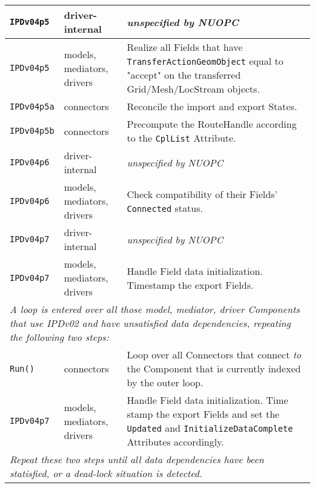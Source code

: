 \begin{longtable}[h]{|p{35mm}|p{4cm}|p{6cm}|}
     {\tt IPDv04p5}   & driver-internal             & {\em unspecified by NUOPC}\\ \hline
     {\tt IPDv04p5}   & models, mediators, drivers  & Realize all Fields that have {\tt TransferActionGeomObject} equal to "accept" on the transferred Grid/Mesh/LocStream objects.\\ \hline
     {\tt IPDv04p5a}  & connectors                  & Reconcile the import and export States.\\ \hline
     {\tt IPDv04p5b}  & connectors                  & Precompute the RouteHandle according to the {\tt CplList} Attribute.\\ \hline
     {\tt IPDv04p6}   & driver-internal             & {\em unspecified by NUOPC}\\ \hline
     {\tt IPDv04p6}   & models, mediators, drivers  & Check compatibility of their Fields' {\tt Connected} status.\\ \hline
     {\tt IPDv04p7}   & driver-internal             & {\em unspecified by NUOPC}\\ \hline
     {\tt IPDv04p7}   & models, mediators, drivers  & Handle Field data initialization. Timestamp the export Fields.\\ \hline
     \multicolumn{3}{|p{13.5cm}|}{\it A loop is entered over all those model, mediator, driver Components that use IPDv02 and have
     unsatisfied data dependencies, repeating the following two steps:}\\ \hline
     {\tt Run()}      & connectors                  & Loop over all Connectors that connect {\it to} the Component that is currently indexed by the outer loop.\\ \hline
     {\tt IPDv04p7}   & models, mediators, drivers  & Handle Field data initialization. Time stamp the export Fields and set the {\tt Updated} and {\tt InitializeDataComplete} Attributes accordingly.\\ \hline
     \multicolumn{3}{|p{13.5cm}|}{\it Repeat these two steps until all data
     dependencies have been statisfied, or a dead-lock situation is detected.}\\ 
     \hline\hline
\end{longtable}


